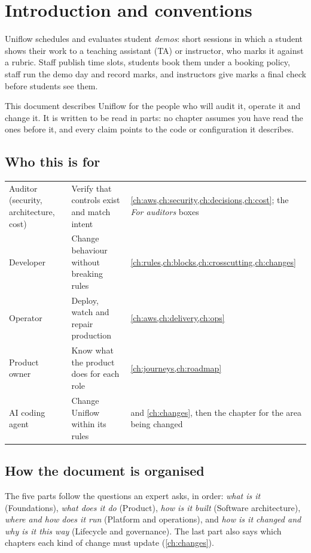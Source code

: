 \chapter{Introduction and conventions}\label{ch:intro}

Uniflow schedules and evaluates student \emph{demos}: short sessions in which a student shows
their work to a teaching assistant (TA) or instructor, who marks it against a rubric. Staff
publish time slots, students book them under a booking policy, staff run the demo day and
record marks, and instructors give marks a final check before students see them.

This document describes Uniflow for the people who will audit it, operate it and change it. It is
written to be read in parts: no chapter assumes you have read the ones before it, and every
claim points to the code or configuration it describes.

\section{Who this is for}
\begin{xltabular}{\linewidth}{@{}P{30mm} L L@{}}
  \toprule
   &  & \\
  \midrule
  Auditor (security, architecture, cost) & Verify that controls exist and match intent & \cref{ch:aws,ch:security,ch:decisions,ch:cost}; the \emph{For auditors} boxes\\
  Developer & Change behaviour without breaking rules & \cref{ch:rules,ch:blocks,ch:crosscutting,ch:changes}\\
  Operator & Deploy, watch and repair production & \cref{ch:aws,ch:delivery,ch:ops}\\
  Product owner & Know what the product does for each role & \cref{ch:journeys,ch:roadmap}\\
  AI coding agent & Change Uniflow within its rules &  and \cref{ch:changes}, then the chapter for the area being changed\\
  \bottomrule
\end{xltabular}

\section{How the document is organised}
The five parts follow the questions an expert asks, in order: \emph{what is it}
(Foundations), \emph{what does it do} (Product), \emph{how is it built} (Software
architecture), \emph{where and how does it run} (Platform and operations), and \emph{how is it
changed and why is it this way} (Lifecycle and governance). The last part also says which chapters
each kind of change must update (\cref{ch:changes}).

